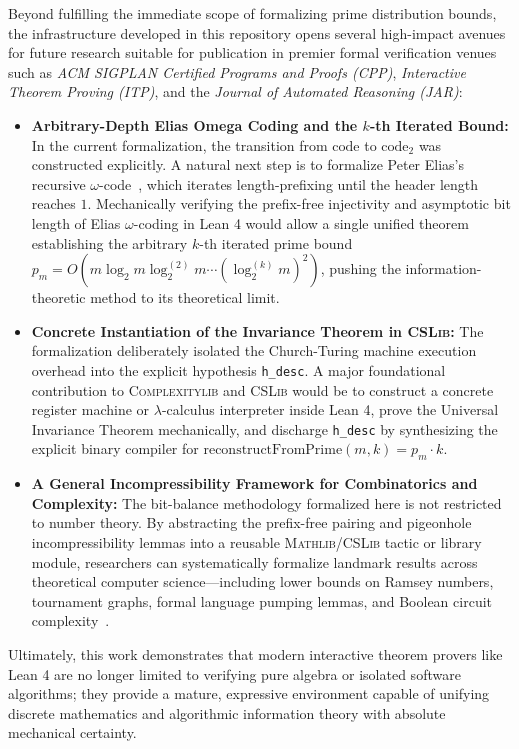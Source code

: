\documentclass[acmsmall,natbib=false,nonacm]{acmart}
\begin{document}
Beyond fulfilling the immediate scope of formalizing prime distribution bounds, the infrastructure developed in this repository opens several high-impact avenues for future research suitable for publication in premier formal verification venues such as \textit{ACM SIGPLAN Certified Programs and Proofs (CPP)}, \textit{Interactive Theorem Proving (ITP)}, and the \textit{Journal of Automated Reasoning (JAR)}:
\begin{itemize}
    \item \textbf{Arbitrary-Depth Elias Omega Coding and the $k$-th Iterated Bound:} In the current formalization, the transition from $\text{code}$ to $\text{code}_2$ was constructed explicitly. A natural next step is to formalize Peter Elias's recursive $\omega$-code~\cite{elias1975universal}, which iterates length-prefixing until the header length reaches $1$. Mechanically verifying the prefix-free injectivity and asymptotic bit length of Elias $\omega$-coding in Lean 4 would allow a single unified theorem establishing the arbitrary $k$-th iterated prime bound $p_m = O(m \log_2 m \log_2^{(2)} m \cdots (\log_2^{(k)} m)^2)$, pushing the information-theoretic method to its theoretical limit.
    \item \textbf{Concrete Instantiation of the Invariance Theorem in \textsc{CSLib}:} The formalization deliberately isolated the Church-Turing machine execution overhead into the explicit hypothesis \texttt{h\_desc}. A major foundational contribution to \textsc{Complexitylib} and \textsc{CSLib} would be to construct a concrete register machine or $\lambda$-calculus interpreter inside Lean 4, prove the Universal Invariance Theorem mechanically, and discharge \texttt{h\_desc} by synthesizing the explicit binary compiler for $\text{reconstructFromPrime}(m, k) = p_m \cdot k$.
    \item \textbf{A General Incompressibility Framework for Combinatorics and Complexity:} The bit-balance methodology formalized here is not restricted to number theory. By abstracting the prefix-free pairing and pigeonhole incompressibility lemmas into a reusable \textsc{Mathlib}/\textsc{CSLib} tactic or library module, researchers can systematically formalize landmark results across theoretical computer science—including lower bounds on Ramsey numbers, tournament graphs, formal language pumping lemmas, and Boolean circuit complexity~\cite{li2019introduction}.
\end{itemize}

Ultimately, this work demonstrates that modern interactive theorem provers like Lean 4 are no longer limited to verifying pure algebra or isolated software algorithms; they provide a mature, expressive environment capable of unifying discrete mathematics and algorithmic information theory with absolute mechanical certainty.


\end{document}
